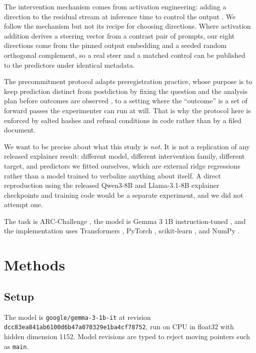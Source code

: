 \documentclass{article}
\begin{document}
The intervention mechanism comes from activation engineering: adding a direction to the residual
stream at inference time to control the output \citep{turner2023activation}. We follow the mechanism
but not its recipe for choosing directions. Where activation addition derives a steering vector from
a contrast pair of prompts, our eight directions come from the pinned output embedding and a seeded
random orthogonal complement, so a real steer and a matched control can be published to the
predictors under identical metadata.

The precommitment protocol adapts preregistration practice, whose purpose is to keep prediction
distinct from postdiction by fixing the question and the analysis plan before outcomes are observed
\citep{nosek2018preregistration}, to a setting where the ``outcome'' is a set of forward passes the
experimenter can run at will. That is why the protocol here is enforced by salted hashes and refusal
conditions in code rather than by a filed document.

We want to be precise about what this study is \emph{not}. It is not a replication of any released
explainer result: different model, different intervention family, different target, and predictors
we fitted ourselves, which are external ridge regressions rather than a model trained to verbalize
anything about itself. A direct reproduction using the released Qwen3-8B and Llama-3.1-8B explainer
checkpoints and training code \citep{transluce2025introspectiveinterp} would be a separate
experiment, and we did not attempt one.

The task is ARC-Challenge \citep{clark2018arc}, the model is Gemma 3 1B instruction-tuned
\citep{gemmateam2025gemma3, gemma3_1b_it}, and the implementation uses Transformers
\citep{wolf2020transformers}, PyTorch \citep{paszke2019pytorch}, scikit-learn
\citep{pedregosa2011scikit}, and NumPy \citep{harris2020numpy}.

\section{Methods}

\subsection{Setup}

The model is \texttt{google/gemma-3-1b-it} at revision
\texttt{dcc83ea841ab6100d6b47a070329e1ba4cf78752}, run on CPU in float32 with hidden dimension
1152. Model revisions are typed to reject moving pointers such as \texttt{main}.
\end{document}
